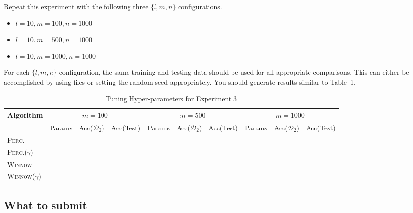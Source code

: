 \documentclass[12pt,letterpaper]{article}
\begin{document}
\begin{enumerate}
\begin{enumerate}
Repeat this experiment with the following three $\{l,m,n\}$ configurations.

\begin{itemize}
\item
$l=10, m=100, n=1000$
\item
$l=10, m=500, n=1000$
\item
$l=10, m=1000, n=1000$
\end{itemize}

For each $\{l,m,n\}$ configuration, the same training and testing data should be used for all appropriate comparisons.  This can either be accomplished by using files or setting the random seed appropriately.  You should generate results similar to Table~\ref{table:exp3}.
%
\begin{table}[htb]
\footnotesize
\begin{center}
\begin{tabular}{|l|c|c|c|c|c|c|c|c|c|}
\hline
Algorithm & \multicolumn{3}{|c|}{$m=100$} & \multicolumn{3}{|c|}{$m=500$} & \multicolumn{3}{|c|}{$m=1000$} \\
\hline
& Params & Acc($\mathcal{D}_2$) & Acc(Test) & Params & Acc($\mathcal{D}_2$) & Acc(Test) & Params & Acc($\mathcal{D}_2$) & Acc(Test) \\
\hline
\textsc{Perc.} & & & & & & & & & \\
\hline
\textsc{Perc.}($\gamma$) & & & & & & & & & \\
\hline
\textsc{Winnow} & & & & & & & & & \\
\hline
\textsc{Winnow}($\gamma$) & & & & & & & & & \\
\hline
\end{tabular}
\end{center}
\caption{Tuning Hyper-parameters for Experiment 3}
\label{table:exp3}
\end{table}

\end{enumerate}

\subsection*{What to submit}


\end{enumerate}
\end{document}
